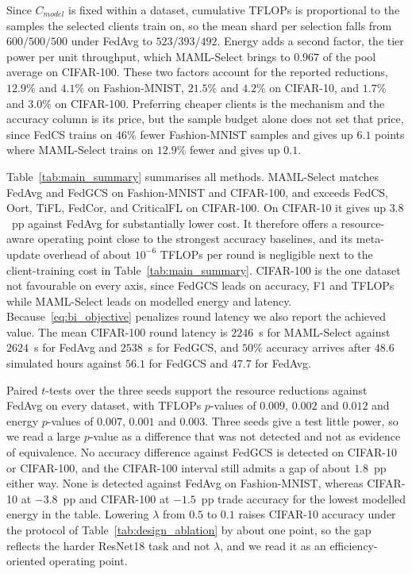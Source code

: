 \documentclass[journal]{IEEEtran}
\theoremstyle{remark}
\newcommand{\revision}[1]{#1}
\newcommand{\revtwo}[1]{#1}
\begin{document}
\revtwo{Since $C_{model}$ is fixed within a dataset, cumulative TFLOPs is proportional to the samples the selected clients train on, so the mean shard per selection falls from $600/500/500$ under FedAvg to $523/393/492$. Energy adds a second factor, the tier power per unit throughput, which MAML-Select brings to $0.967$ of the pool average on CIFAR-100. These two factors account for the reported reductions, $12.9\%$ and $4.1\%$ on Fashion-MNIST, $21.5\%$ and $4.2\%$ on CIFAR-10, and $1.7\%$ and $3.0\%$ on CIFAR-100. Preferring cheaper clients is the mechanism and the accuracy column is its price, but the sample budget alone does not set that price, since FedCS trains on $46\%$ fewer Fashion-MNIST samples and gives up $6.1$ points where MAML-Select trains on $12.9\%$ fewer and gives up $0.1$.}

\revision{Table~\ref{tab:main_summary} summarises all methods. MAML-Select matches FedAvg and FedGCS on Fashion-MNIST and CIFAR-100, and exceeds FedCS, Oort, TiFL, FedCor, and CriticalFL on CIFAR-100. On CIFAR-10 it gives up $3.8$~pp against FedAvg for substantially lower cost. It therefore offers a resource-aware operating point close to the strongest accuracy baselines, and its meta-update overhead of about $10^{-6}$ TFLOPs per round is negligible next to the client-training cost in Table~\ref{tab:main_summary}.} \revtwo{CIFAR-100 is the one dataset not favourable on every axis, since FedGCS leads on accuracy, F1 and TFLOPs while MAML-Select leads on modelled energy and latency. Because~\eqref{eq:bi_objective} penalizes round latency we also report the achieved value. The mean CIFAR-100 round latency is $2246$~s for MAML-Select against $2624$~s for FedAvg and $2538$~s for FedGCS, and $50\%$ accuracy arrives after $48.6$ simulated hours against $56.1$ for FedGCS and $47.7$ for FedAvg.}

\revision{Paired $t$-tests over the three seeds support the resource reductions against FedAvg on every dataset, with TFLOPs $p$-values of $0.009$, $0.002$ and $0.012$ and energy $p$-values of $0.007$, $0.001$ and $0.003$.} \revtwo{Three seeds give a test little power, so we read a large $p$-value as a difference that was not detected and not as evidence of equivalence. No accuracy difference against FedGCS is detected on CIFAR-10 or CIFAR-100, and the CIFAR-100 interval still admits a gap of about $1.8$~pp either way. None is detected against FedAvg on Fashion-MNIST, whereas CIFAR-10 at $-3.8$~pp and CIFAR-100 at $-1.5$~pp trade accuracy for the lowest modelled energy in the table.} \revision{Lowering $\lambda$ from $0.5$ to $0.1$ raises CIFAR-10 accuracy under the protocol of Table~\ref{tab:design_ablation} by about one point, so the gap reflects the harder ResNet18 task and not $\lambda$, and we read it as an efficiency-oriented operating point.}
\end{document}
